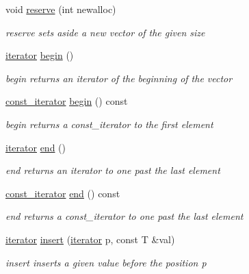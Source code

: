 \begin{DoxyCompactItemize}
void \hyperlink{classmyStd_1_1vector_a50e786a02a59e689999365037ae26b3a}{reserve} (int newalloc)
\begin{DoxyCompactList}\small\item\em reserve sets aside a new vector of the given size \end{DoxyCompactList}\item 
\hyperlink{classmyStd_1_1vector_a667a65b093f1253d2229d06768aa3bf9}{iterator} \hyperlink{classmyStd_1_1vector_adaa284b6b387f70d3244b4d6e64869c3}{begin} ()
\begin{DoxyCompactList}\small\item\em begin returns an iterator of the beginning of the vector \end{DoxyCompactList}\item 
\hyperlink{classmyStd_1_1vector_ae8f53b1db01169b861f0299f9ced0e37}{const\+\_\+iterator} \hyperlink{classmyStd_1_1vector_a71600f2a06ab5c279a469972d713d5d6}{begin} () const 
\begin{DoxyCompactList}\small\item\em begin returns a const\+\_\+iterator to the first element \end{DoxyCompactList}\item 
\hyperlink{classmyStd_1_1vector_a667a65b093f1253d2229d06768aa3bf9}{iterator} \hyperlink{classmyStd_1_1vector_a8fc7ec068c194f5ecb5a08e17a9c9ac4}{end} ()
\begin{DoxyCompactList}\small\item\em end returns an iterator to one past the last element \end{DoxyCompactList}\item 
\hyperlink{classmyStd_1_1vector_ae8f53b1db01169b861f0299f9ced0e37}{const\+\_\+iterator} \hyperlink{classmyStd_1_1vector_adecc27953fecd9a02c54f2b2d6a28cff}{end} () const 
\begin{DoxyCompactList}\small\item\em end returns a const\+\_\+iterator to one past the last element \end{DoxyCompactList}\item 
\hyperlink{classmyStd_1_1vector_a667a65b093f1253d2229d06768aa3bf9}{iterator} \hyperlink{classmyStd_1_1vector_a2dfafafc64febfbb0869be81f6bd4de7}{insert} (\hyperlink{classmyStd_1_1vector_a667a65b093f1253d2229d06768aa3bf9}{iterator} p, const T \&val)
\begin{DoxyCompactList}\small\item\em insert inserts a given value before the position p \end{DoxyCompactList}\item 

\end{DoxyCompactItemize}
